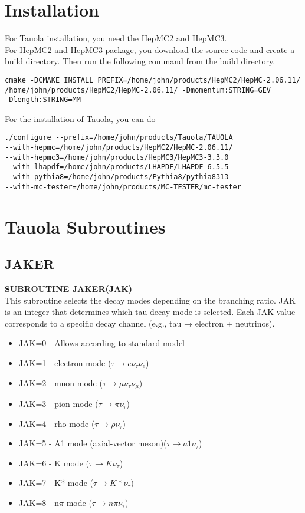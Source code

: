 \documentclass[12pt]{article}
\begin{document}
\maketitlepage

\section{Installation}

For Tauola installation, you need the HepMC2 and HepMC3.\\

For HepMC2 and HepMC3 package, you download the source code and create a build directory. Then run the following command from the build directory.

\begin{verbatim}
cmake -DCMAKE_INSTALL_PREFIX=/home/john/products/HepMC2/HepMC-2.06.11/ 
/home/john/products/HepMC2/HepMC-2.06.11/ -Dmomentum:STRING=GEV
-Dlength:STRING=MM 
\end{verbatim}

For the installation of Tauola, you can do 
\begin{verbatim}
./configure --prefix=/home/john/products/Tauola/TAUOLA 
--with-hepmc=/home/john/products/HepMC2/HepMC-2.06.11/ 
--with-hepmc3=/home/john/products/HepMC3/HepMC3-3.3.0 
--with-lhapdf=/home/john/products/LHAPDF/LHAPDF-6.5.5 
--with-pythia8=/home/john/products/Pythia8/pythia8313 
--with-mc-tester=/home/john/products/MC-TESTER/mc-tester
\end{verbatim}


\section{Tauola Subroutines}
\subsection{JAKER}
\textbf{SUBROUTINE JAKER(JAK)}\\
This subroutine selects the decay modes depending on the branching ratio. JAK is an integer that determines which tau decay mode is selected. Each JAK value corresponds to a specific decay channel (e.g., tau → electron + neutrinos).

\begin{itemize}
    \item JAK=0 - Allows according to standard model
    \item JAK=1 - electron mode ($\tau \rightarrow  e \nu_\tau \nu_e$)
    \item JAK=2 - muon mode ($\tau \rightarrow  \mu \nu_\tau \nu_\mu$)
    \item JAK=3 - pion mode ($\tau \rightarrow  \pi \nu_\tau$)
    \item JAK=4 - rho mode ($\tau \rightarrow  \rho \nu_\tau$)
    \item JAK=5 - A1 mode (axial-vector meson)($\tau \rightarrow  a1 \nu_\tau$)
    \item JAK=6 - K mode ($\tau \rightarrow  K \nu_\tau$)
    \item JAK=7 - K* mode ($\tau \rightarrow  K* \nu_\tau$)
    \item JAK=8 - n$\pi$ mode ($\tau \rightarrow  n\pi \nu_\tau$)
\end{itemize}
\end{document}
